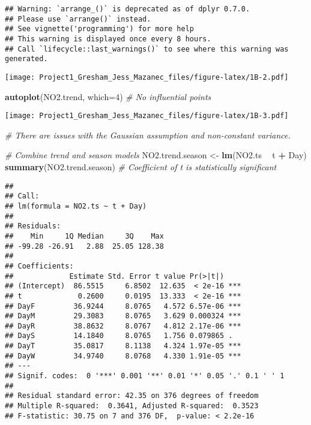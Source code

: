 \documentclass[
]{article}
\newenvironment{Shaded}{\begin{snugshade}}{\end{snugshade}}
\newcommand{\CommentTok}[1]{\textcolor[rgb]{0.56,0.35,0.01}{\textit{#1}}}
\newcommand{\DataTypeTok}[1]{\textcolor[rgb]{0.13,0.29,0.53}{#1}}
\newcommand{\DecValTok}[1]{\textcolor[rgb]{0.00,0.00,0.81}{#1}}
\newcommand{\KeywordTok}[1]{\textcolor[rgb]{0.13,0.29,0.53}{\textbf{#1}}}
\newcommand{\NormalTok}[1]{#1}
\newcommand{\OperatorTok}[1]{\textcolor[rgb]{0.81,0.36,0.00}{\textbf{#1}}}
\newcommand{\StringTok}[1]{\textcolor[rgb]{0.31,0.60,0.02}{#1}}
\begin{document}
\begin{verbatim}
## Warning: `arrange_()` is deprecated as of dplyr 0.7.0.
## Please use `arrange()` instead.
## See vignette('programming') for more help
## This warning is displayed once every 8 hours.
## Call `lifecycle::last_warnings()` to see where this warning was generated.
\end{verbatim}

\texttt{[image: Project1\_Gresham\_Jess\_Mazanec\_files/figure-latex/1B-2.pdf]}

\begin{Shaded}
\begin{Highlighting}[]
\KeywordTok{autoplot}\NormalTok{(NO2.trend, }\DataTypeTok{which=}\DecValTok{4}\NormalTok{) }\CommentTok{# No influential points}
\end{Highlighting}
\end{Shaded}

\texttt{[image: Project1\_Gresham\_Jess\_Mazanec\_files/figure-latex/1B-3.pdf]}

\begin{Shaded}
\begin{Highlighting}[]
\CommentTok{# There are issues with the Gaussian assumption and non-constant variance.}

\CommentTok{# Combine trend and season models}
\NormalTok{NO2.trend.season <-}\StringTok{ }\KeywordTok{lm}\NormalTok{(NO2.ts }\OperatorTok{~}\StringTok{ }\NormalTok{t }\OperatorTok{+}\StringTok{ }\NormalTok{Day)}
\KeywordTok{summary}\NormalTok{(NO2.trend.season) }\CommentTok{# Coefficient of t is statistically significant}
\end{Highlighting}
\end{Shaded}

\begin{verbatim}
## 
## Call:
## lm(formula = NO2.ts ~ t + Day)
## 
## Residuals:
##    Min     1Q Median     3Q    Max 
## -99.28 -26.91   2.88  25.05 128.38 
## 
## Coefficients:
##             Estimate Std. Error t value Pr(>|t|)    
## (Intercept)  86.5515     6.8502  12.635  < 2e-16 ***
## t             0.2600     0.0195  13.333  < 2e-16 ***
## DayF         36.9244     8.0765   4.572 6.57e-06 ***
## DayM         29.3083     8.0765   3.629 0.000324 ***
## DayR         38.8632     8.0767   4.812 2.17e-06 ***
## DayS         14.1840     8.0765   1.756 0.079865 .  
## DayT         35.0817     8.1138   4.324 1.97e-05 ***
## DayW         34.9740     8.0768   4.330 1.91e-05 ***
## ---
## Signif. codes:  0 '***' 0.001 '**' 0.01 '*' 0.05 '.' 0.1 ' ' 1
## 
## Residual standard error: 42.35 on 376 degrees of freedom
## Multiple R-squared:  0.3641, Adjusted R-squared:  0.3523 
## F-statistic: 30.75 on 7 and 376 DF,  p-value: < 2.2e-16
\end{verbatim}
\end{document}
